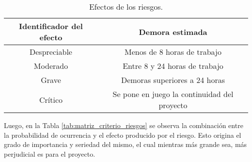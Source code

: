 \begin{table}[htbp]
	\centering
	\begin{tabular}{|c|c|}
		\hline
		\rowcolor[HTML]{EFEFEF} 
    \textbf{Identificador del efecto} & \textbf{Demora estimada}      \\ \hline
		\rowcolor[HTML]{FFFFFF} 
    {\color[HTML]{000000} Despreciable}            & {\color[HTML]{000000} Menos de 8 horas de trabajo}    \\ \hline
    \rowcolor[HTML]{FFFFFF} 
  {\color[HTML]{000000} Moderado}            & {\color[HTML]{000000} Entre 8 y 24 horas de trabajo}    \\ \hline
		\rowcolor[HTML]{FFFFFF} 
		{\color[HTML]{000000} Grave}           & {\color[HTML]{000000} Demoras superiores a 24 horas}    \\ \hline
		\rowcolor[HTML]{FFFFFF} 
		{\color[HTML]{000000} Crítico}            & {\color[HTML]{000000} Se pone en juego la continuidad del proyecto} \\ \hline
	\end{tabular}
	\caption{Efectos de los riesgos.}
	\label{tab:seriedad_riesgo}
\end{table}



Luego, en la Tabla \ref{tab:matriz_criterio_riesgos} se observa la combinación entre la probabilidad de ocurrencia y el efecto producido por el riesgo. Esto origina el grado de importancia y seriedad del mismo, el cual mientras más grande sea, más perjudicial es para el proyecto.

